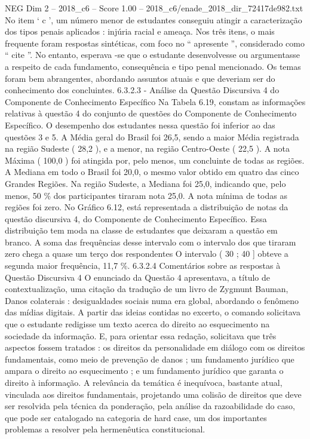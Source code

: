 \begin{textsample}{NEG Dim 2 – 2018\_c6 – Score 1.00 – 2018\_c6/enade\_2018\_dir\_72417de982.txt}
No item ‘ c ’, um número menor de estudantes conseguiu atingir a caracterização dos tipos penais aplicados : injúria racial e ameaça.
Nos três itens, o mais frequente foram respostas sintéticas, com foco no “ apresente ”, considerado como “ cite ”.
No entanto, esperava -se que o estudante desenvolvesse ou argumentasse a respeito de cada fundamento, consequência e tipo penal mencionado.
Os temas foram bem abrangentes, abordando assuntos atuais e que deveriam ser do conhecimento dos concluintes. 6.3.2.3 - Análise da Questão Discursiva 4 do Componente de Conhecimento Específico Na Tabela 6.19, constam as informações relativas à questão 4 do conjunto de questões do Componente de Conhecimento Específico.
O desempenho dos estudantes nessa questão foi inferior ao das questões 3 e 5.
A Média geral do Brasil foi 26,5, sendo a maior Média registrada na região Sudeste ( 28,2 ), e a menor, na região Centro-Oeste ( 22,5 ).
A nota Máxima ( 100,0 ) foi atingida por, pelo menos, um concluinte de todas as regiões.
A Mediana em todo o Brasil foi 20,0, o mesmo valor obtido em quatro das cinco Grandes Regiões.
Na região Sudeste, a Mediana foi 25,0, indicando que, pelo menos, 50 \% dos participantes tiraram nota 25,0.
A nota mínima de todas as regiões foi zero.
No Gráfico 6.12, está representada a distribuição de notas da questão discursiva 4, do Componente de Conhecimento Específico.
Essa distribuição tem moda na classe de estudantes que deixaram a questão em branco.
A soma das frequências desse intervalo com o intervalo dos que tiraram zero chega a quase um terço dos respondentes O intervalo ( 30 ; 40 ] obteve a segunda maior frequência, 11,7 \%. 6.3.2.4 Comentários sobre as respostas à Questão Discursiva 4 O enunciado da Questão 4 apresentava, a título de contextualização, uma citação da tradução de um livro de Zygmunt Bauman, Danos colaterais : desigualdades sociais numa era global, abordando o fenômeno das mídias digitais.
A partir das ideias contidas no excerto, o comando solicitava que o estudante redigisse um texto acerca do direito ao esquecimento na sociedade da informação.
E, para orientar essa redação, solicitava que três aspectos fossem tratados : os direitos da personalidade em diálogo com os direitos fundamentais, como meio de prevenção de danos ; um fundamento jurídico que ampara o direito ao esquecimento ; e um fundamento jurídico que garanta o direito à informação.
A relevância da temática é inequívoca, bastante atual, vinculada aos direitos fundamentais, projetando uma colisão de direitos que deve ser resolvida pela técnica da ponderação, pela análise da razoabilidade do caso, que pode ser catalogado na categoria de hard case, um dos importantes problemas a resolver pela hermenêutica constitucional.

\end{textsample}
